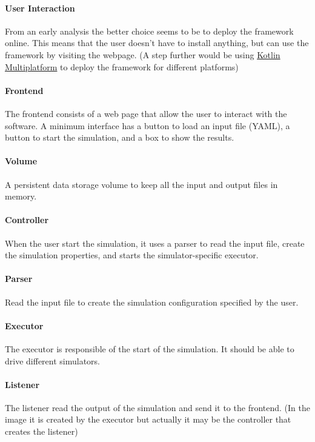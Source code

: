 \documentclass[12pt,a4paper,openright,twoside]{book}
\begin{document}
\paragraph*{User Interaction} From an early analysis the better choice seems to be to deploy the framework online.
This means that the user doesn't have to install anything, but can use the framework by visiting the webpage.
(A step further would be using \href{https://kotlinlang.org/docs/multiplatform.html#kotlin-multiplatform-use-cases}{Kotlin Multiplatform} to deploy the framework for different platforms)

\paragraph*{Frontend} The frontend consists of a web page that allow the user to interact with the software. 
A minimum interface has a button to load an input file (YAML), a button to start the simulation, and a box to show the results.

\paragraph*{Volume} A persistent data storage volume to keep all the input and output files in memory.

\paragraph*{Controller} When the user start the simulation, it uses a parser to read the input file, create the simulation properties,
and starts the simulator-specific executor.

\paragraph*{Parser} Read the input file to create the simulation configuration specified by the user.

\paragraph*{Executor} The executor is responsible of the start of the simulation. It should be able to drive different simulators.

\paragraph*{Listener} The listener read the output of the simulation and send it to the frontend.
(In the image it is created by the executor but actually it may be the controller that creates the listener)
\end{document}
